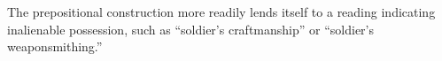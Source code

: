 The prepositional construction more readily lends itself to a reading indicating inalienable possession, such as “soldier's craftmanship” or “soldier's weaponsmithing.”







